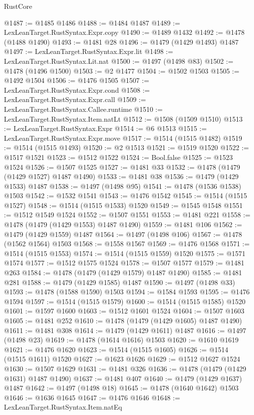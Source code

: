 \begin{lexlean}{RustCore}
\begin{coremodule}
@1487 := @1485 @1486
@1488 := @1484 @1487
@1489 := LexLeanTarget.RustSyntax.Expr.copy
@1490 := @1489 @1432
@1492 := @1478 (@1488 @1490)
@1493 := @1481 @28
@1496 := @1479 (@1429 @1493) @1487
@1497 := LexLeanTarget.RustSyntax.Expr.lit
@1498 := LexLeanTarget.RustSyntax.Lit.nat
@1500 := @1497 (@1498 @83)
@1502 := @1478 (@1496 @1500)
@1503 := @2 @1477
@1504 := @1502 @1503
@1505 := @1492 @1504
@1506 := @1476 @1505
@1507 := LexLeanTarget.RustSyntax.Expr.cond
@1508 := LexLeanTarget.RustSyntax.Expr.call
@1509 := LexLeanTarget.RustSyntax.Callee.runtime
@1510 := LexLeanTarget.RustSyntax.Item.natLt
@1512 := @1508 (@1509 @1510)
@1513 := LexLeanTarget.RustSyntax.Expr
@1514 := @6 @1513
@1515 := LexLeanTarget.RustSyntax.Expr.move
@1517 := @1514 (@1515 @1482)
@1519 := @1514 (@1515 @1493)
@1520 := @2 @1513
@1521 := @1519 @1520
@1522 := @1517 @1521
@1523 := @1512 @1522
@1524 := Bool.false
@1525 := @1523 @1524
@1526 := @1507 @1525
@1527 := @1481 @33
@1532 := @1478 (@1479 (@1429 @1527) @1487 @1490)
@1533 := @1481 @38
@1536 := @1479 (@1429 @1533) @1487
@1538 := @1497 (@1498 @95)
@1541 := @1478 (@1536 @1538) @1503
@1542 := @1532 @1541
@1543 := @1476 @1542
@1545 := @1514 (@1515 @1527)
@1548 := @1514 (@1515 @1533) @1520
@1549 := @1545 @1548
@1551 := @1512 @1549 @1524
@1552 := @1507 @1551
@1553 := @1481 @221
@1558 := @1478 (@1479 (@1429 @1553) @1487 @1490)
@1559 := @1481 @106
@1562 := @1479 (@1429 @1559) @1487
@1564 := @1497 (@1498 @106)
@1567 := @1478 (@1562 @1564) @1503
@1568 := @1558 @1567
@1569 := @1476 @1568
@1571 := @1514 (@1515 @1553)
@1574 := @1514 (@1515 @1559) @1520
@1575 := @1571 @1574
@1577 := @1512 @1575 @1524
@1578 := @1507 @1577
@1579 := @1481 @263
@1584 := @1478 (@1479 (@1429 @1579) @1487 @1490)
@1585 := @1481 @281
@1588 := @1479 (@1429 @1585) @1487
@1590 := @1497 (@1498 @33)
@1593 := @1478 (@1588 @1590) @1503
@1594 := @1584 @1593
@1595 := @1476 @1594
@1597 := @1514 (@1515 @1579)
@1600 := @1514 (@1515 @1585) @1520
@1601 := @1597 @1600
@1603 := @1512 @1601 @1524
@1604 := @1507 @1603
@1605 := @1481 @252
@1610 := @1478 (@1479 (@1429 @1605) @1487 @1490)
@1611 := @1481 @308
@1614 := @1479 (@1429 @1611) @1487
@1616 := @1497 (@1498 @23)
@1619 := @1478 (@1614 @1616) @1503
@1620 := @1610 @1619
@1621 := @1476 @1620
@1623 := @1514 (@1515 @1605)
@1626 := @1514 (@1515 @1611) @1520
@1627 := @1623 @1626
@1629 := @1512 @1627 @1524
@1630 := @1507 @1629
@1631 := @1481 @326
@1636 := @1478 (@1479 (@1429 @1631) @1487 @1490)
@1637 := @1481 @407
@1640 := @1479 (@1429 @1637) @1487
@1642 := @1497 (@1498 @18)
@1645 := @1478 (@1640 @1642) @1503
@1646 := @1636 @1645
@1647 := @1476 @1646
@1648 := LexLeanTarget.RustSyntax.Item.natEq

\end{coremodule}
\end{lexlean}
